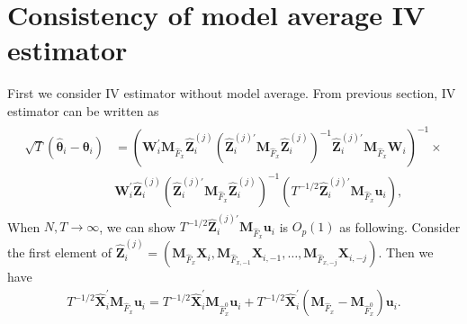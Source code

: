 \documentclass[12pt,a4paper,hyperref]{article}
\begin{document}
\section{Consistency of model average IV estimator}
First we consider IV estimator without model average. From previous section, IV estimator can be written as 
\begin{align}
\begin{split}
\sqrt{T}\left(\hat{\boldsymbol{\theta}}_{i}-\boldsymbol{\theta}_{i}\right)&= \left( \boldsymbol{W}^{'}_{i}\boldsymbol{M}_{\hat{F}_{x}}\hat{\boldsymbol{Z}}^{(j)}_{i} \left(\hat{\boldsymbol{Z}}^{(j)'}_{i}\boldsymbol{M}_{\hat{F}_{x}}\hat{\boldsymbol{Z}}^{(j)}_{i} \right)^{-1}\hat{\boldsymbol{Z}}^{(j)'}_{i}\boldsymbol{M}_{\hat{F}_{x}} \boldsymbol{W}_{i} \right)^{-1} \times \\ &\boldsymbol{W}^{'}_{i}\hat{\boldsymbol{Z}}^{(j)}_{i} \left(\hat{\boldsymbol{Z}}^{(j)'}_{i}\boldsymbol{M}_{\hat{F}_{x}}\hat{\boldsymbol{Z}}^{(j)}_{i} \right)^{-1}\left( T^{-1/2} \hat{\boldsymbol{Z}}^{(j)'}_{i}\boldsymbol{M}_{\hat{F}_{x}} \boldsymbol{u}_{i}\right),
\end{split}
\end{align}
When $N,T \to \infty$, we can show $T^{-1/2} \hat{\boldsymbol{Z}}^{(j)'}_{i}\boldsymbol{M}_{\hat{F}_{x}} \boldsymbol{u}_{i}$ is $O_{p}\left(1 \right)$ as following.
Consider the first element of $\hat{\boldsymbol{Z}}^{(j)}_{i}=\left( \boldsymbol{M}_{\hat{F}_{x}}\boldsymbol{X}_{i}, \boldsymbol{M}_{\hat{F}_{x,-1}}\boldsymbol{X}_{i,-1},\ldots  ,\boldsymbol{M}_{\hat{F}_{x,-j}}\boldsymbol{X}_{i,-j} \right).$ Then we have 
\begin{align}
T^{-1/2} \hat{\boldsymbol{X}}^{'}_{i}\boldsymbol{M}_{\hat{F}_{x}} \boldsymbol{u}_{i}= T^{-1/2} \hat{\boldsymbol{X}}^{'}_{i}\boldsymbol{M}_{\hat{F}^{0}_{x}} \boldsymbol{u}_{i}+T^{-1/2} \hat{\boldsymbol{X}}^{'}_{i} \left(\boldsymbol{M}_{\hat{F}_{x}} -\boldsymbol{M}_{\hat{F}^{0}_{x}} \right) \boldsymbol{u}_{i}.
\end{align}
\end{document}
